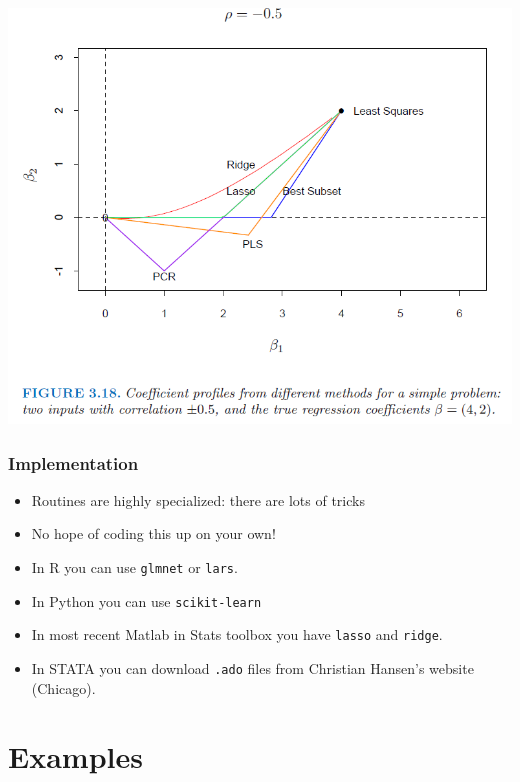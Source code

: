 \begin{frame}
    \vspace{-10pt}
    \begin{center}
    \includegraphics[width=\textwidth]{./resources/ESLshrinkpathNegative}
    \end{center}
\end{frame}

\begin{frame}
\frametitle{Implementation}
\begin{itemize}
\item Routines are highly specialized: there are lots of tricks
\item No hope of coding this up on your own!
\item In R you can use \texttt{glmnet} or \texttt{lars}.
\item In Python you can use \texttt{scikit-learn}
\item In most recent Matlab in Stats toolbox you have \texttt{lasso} and \texttt{ridge}.
\item In STATA you can download \texttt{.ado} files from Christian Hansen's website (Chicago).
\end{itemize}
\end{frame}

\section{Examples}

